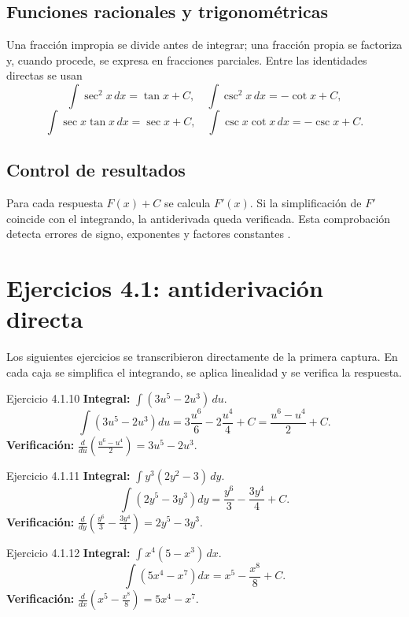 \subsection{Funciones racionales y trigonométricas}
Una fracción impropia se divide antes de integrar; una fracción propia se factoriza y, cuando procede, se expresa en fracciones parciales. Entre las identidades directas se usan
\[
 \int\sec^2x\,dx=\tan x+C,\quad
 \int\csc^2x\,dx=-\cot x+C,
\]
\[
 \int\sec x\tan x\,dx=\sec x+C,\quad
 \int\csc x\cot x\,dx=-\csc x+C.
\]

\subsection{Control de resultados}
Para cada respuesta $F(x)+C$ se calcula $F'(x)$. Si la simplificación de $F'$ coincide con el integrando, la antiderivada queda verificada. Esta comprobación detecta errores de signo, exponentes y factores constantes \citep{thomas2018calculus}.

\section{Ejercicios 4.1: antiderivación directa}
Los siguientes ejercicios se transcribieron directamente de la primera captura. En cada caja se simplifica el integrando, se aplica linealidad y se verifica la respuesta.

\begin{examplebox}{Ejercicio 4.1.10}
\textbf{Integral:} $\displaystyle \int(3u^5-2u^3)\,du$.
\[
 \int(3u^5-2u^3)du
 =3\frac{u^6}{6}-2\frac{u^4}{4}+C
 =\frac{u^6-u^4}{2}+C.
\]
\textbf{Verificación:} $\displaystyle \frac{d}{du}\left(\frac{u^6-u^4}{2}\right)=3u^5-2u^3$.
\end{examplebox}

\begin{examplebox}{Ejercicio 4.1.11}
\textbf{Integral:} $\displaystyle \int y^3(2y^2-3)\,dy$.
\[
 \int(2y^5-3y^3)dy=\frac{y^6}{3}-\frac{3y^4}{4}+C.
\]
\textbf{Verificación:} $\displaystyle \frac{d}{dy}\left(\frac{y^6}{3}-\frac{3y^4}{4}\right)=2y^5-3y^3$.
\end{examplebox}

\begin{examplebox}{Ejercicio 4.1.12}
\textbf{Integral:} $\displaystyle \int x^4(5-x^3)\,dx$.
\[
 \int(5x^4-x^7)dx=x^5-\frac{x^8}{8}+C.
\]
\textbf{Verificación:} $\displaystyle \frac{d}{dx}\left(x^5-\frac{x^8}{8}\right)=5x^4-x^7$.
\end{examplebox}

